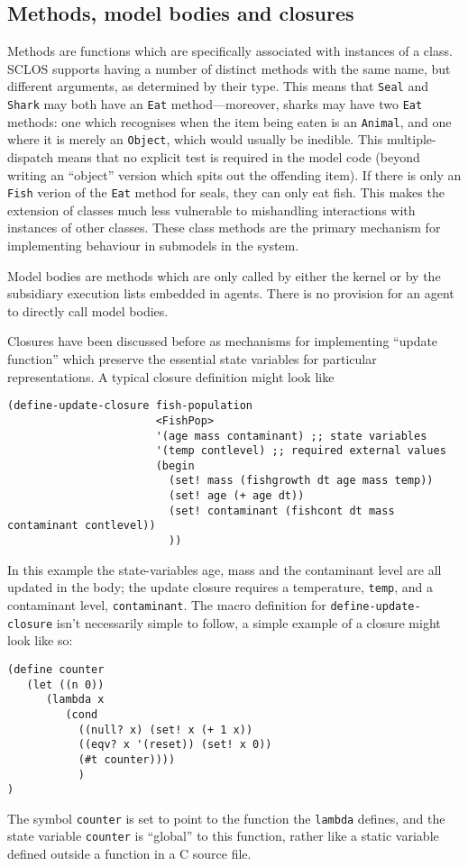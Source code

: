 \subsection{Methods, model bodies and closures}

Methods are functions which are specifically associated with instances
of a class.  \textsf{SCLOS} supports having a number of distinct methods
with the same name, but different arguments, as determined by their
type.  This means that \texttt{Seal} and \texttt{Shark} may both have an
\texttt{Eat} method---moreover, sharks may have two \texttt{Eat}
methods: one which recognises when the item being eaten is an
\texttt{Animal}, and one where it is merely an \texttt{Object}, which
would usually be inedible.  This multiple-dispatch means that no
explicit test is required in the model code (beyond writing an
``object'' version which spits out the offending item).  If there is
only an \texttt{Fish} verion of the \texttt{Eat} method for seals,
they can only eat fish.  This makes the extension of classes much less
vulnerable to mishandling interactions with instances of other
classes.  These class methods are the primary mechanism for
implementing behaviour in submodels in the system.

Model bodies are methods which are only called by either the kernel
or by the subsidiary execution lists embedded in agents. There is no
provision for an agent to directly call model bodies.

Closures have been discussed before as mechanisms for implementing
``update function'' which preserve the essential state variables for
particular representations.  A typical closure definition might look like 
\begin{verbatim}
(define-update-closure fish-population
                       <FishPop>
                       '(age mass contaminant) ;; state variables 
                       '(temp contlevel) ;; required external values
                       (begin
                         (set! mass (fishgrowth dt age mass temp))
                         (set! age (+ age dt))
                         (set! contaminant (fishcont dt mass contaminant contlevel))
                         ))
\end{verbatim}
In this example the state-variables age, mass and the contaminant
level are all updated in the body; the update closure requires a
temperature, \texttt{temp}, and a contaminant level, \texttt{contaminant}.
The macro definition for \texttt{define-update-closure} isn't
necessarily simple to follow, a simple example of a closure might look
like so:
\begin{verbatim}
(define counter 
   (let ((n 0))
      (lambda x 
         (cond
           ((null? x) (set! x (+ 1 x))
           ((eqv? x '(reset)) (set! x 0))
           (#t counter))))
           )
)
\end{verbatim}
The symbol \texttt{counter} is set to point to the function the
\texttt{lambda} defines, and the state variable \texttt{counter} is
``global'' to this function, rather like a static variable defined
outside a function in a C source file. 
             


